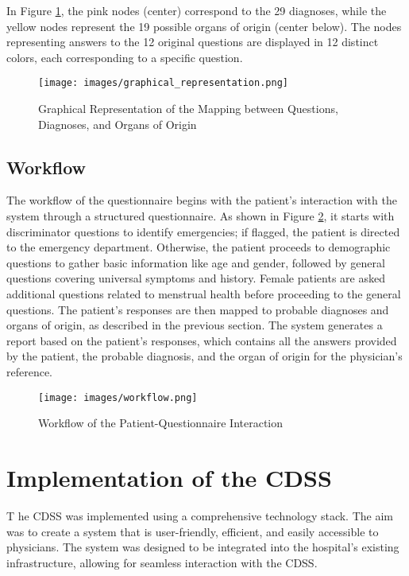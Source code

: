 \noindent In Figure \ref{fig:graphical_representation}, the pink nodes (center) correspond to the 29 diagnoses, while the yellow nodes represent the 19 possible organs of origin (center below). The nodes representing answers to the 12 original questions are displayed in 12 distinct colors, each corresponding to a specific question.

\begin{figure}[H]
    \centering
    \texttt{[image: images/graphical\_representation.png]}
    \caption{Graphical Representation of the Mapping between Questions, Diagnoses, and Organs of Origin}
    \label{fig:graphical_representation}
\end{figure}

\subsection{Workflow}
The workflow of the questionnaire begins with the patient's interaction with the system through a structured questionnaire. As shown in Figure \ref{fig:workflow}, it starts with discriminator questions to identify emergencies; if flagged, the patient is directed to the emergency department. Otherwise, the patient proceeds to demographic questions to gather basic information like age and gender, followed by general questions covering universal symptoms and history. Female patients are asked additional questions related to menstrual health before proceeding to the general questions. The patient's responses are then mapped to probable diagnoses and organs of origin, as described in the previous section. The system generates a report based on the patient's responses, which contains all the answers provided by the patient, the probable diagnosis, and the organ of origin for the physician's reference.
\begin{figure}[h]
    \centering
    \texttt{[image: images/workflow.png]}
    \caption{Workflow of the Patient-Questionnaire Interaction}
    \label{fig:workflow}
\end{figure}

\section{Implementation of the CDSS}
\lettrine{T}{ }he CDSS was implemented using a comprehensive technology stack. The aim was to create a system that is user-friendly, efficient, and easily accessible to physicians. The system was designed to be integrated into the hospital's existing infrastructure, allowing for seamless interaction with the CDSS.\\[\baselineskip]

